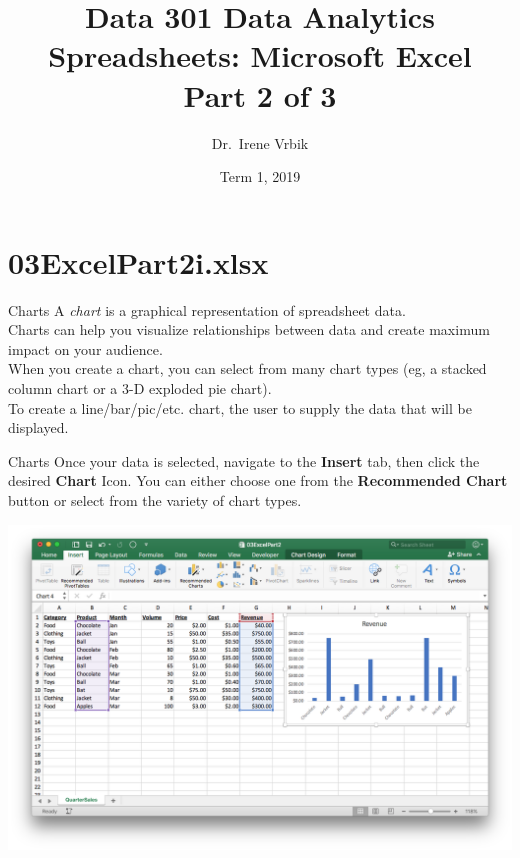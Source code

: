 \documentclass[xcolor=svgnames]{beamer}
\title
  [Data 301 Data Analytics\hspace{2em}]
  {Data 301 Data Analytics\\
  Spreadsheets: Microsoft Excel\\
  Part 2 of 3}
\author
  [Dr.\ Irene Vrbik]
  {Dr.\ Irene Vrbik}
\date
  {Term 1, 2019}
\institute
  {University of British Columbia Okanagan \newline irene.vrbik@ubc.ca}
\begin{document}
\graphicspath{{img/}}


\maketitle



\section
  {03ExcelPart2i.xlsx}



\begin{frame}{Charts}
A \emph{chart} is a graphical representation of spreadsheet data.\\[1em]

Charts can help you visualize relationships between data and create maximum impact on your audience. \\[1em]

When you create a chart, you can select from many chart types (eg, a stacked column chart or a 3-D exploded pie chart). \\[1em]

To create a line/bar/pic/etc. chart, the user to supply the data that will be displayed.\\[1em]
\end{frame}


\begin{frame}{Charts}
Once your data is selected, navigate to the {\bf Insert} tab, then click the desired {\bf Chart} Icon.  You can either choose one from the {\bf Recommended Chart} button or select from the variety of chart types.
 \begin{center}
    \includegraphics[width=.8\textwidth]{barchart}
 \end{center}
 \vspace{-1em}

\end{frame}
\end{document}
